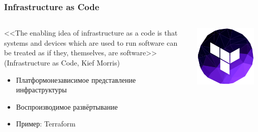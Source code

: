 \documentclass{../../slides-style}
\begin{document}
    \begin{frame}
        \frametitle{Infrastructure as Code}
        \begin{columns}
            \begin{column}{0.7\textwidth}
                <<The enabling idea of infrastructure as a code is that systems and devices which are used to run software can be treated as if they, themselves, are software>> (Infrastructure as Code, Kief Morris)
                \begin{itemize}
                    \item Платформонезависимое представление инфраструктуры
                    \item Воспроизводимое развёртывание
                    \item Пример: Terraform
                \end{itemize}
            \end{column}
            \begin{column}{0.3\textwidth}
                \begin{center}
                    \includegraphics[width=0.9\textwidth]{terraformLogo.png}
                \end{center}
            \end{column}
        \end{columns}
    \end{frame}
\end{document}
